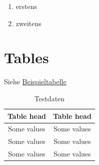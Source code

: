 \documentclass[12pt]{scrartcl}
\begin{document}
\begin{enumerate}
	\item erstens
	\item zweitens
\end{enumerate}


\section{Tables}

	Siehe \hyperref[tab:test]{Beispieltabelle}

	\begin{table}
	\centering
	\begin{tabular}{c|c}

		\rowcolor{gray!15}
	    Table head & Table head \\\hline

	    Some values & Some values \\\hline
    
	    Some values & Some values \\\hline
	    
	    Some values & Some values
	    

	\end{tabular}
	\caption{Testdaten}
	\label{tab:test}
	\end{table}

\clearpage
\end{document}
